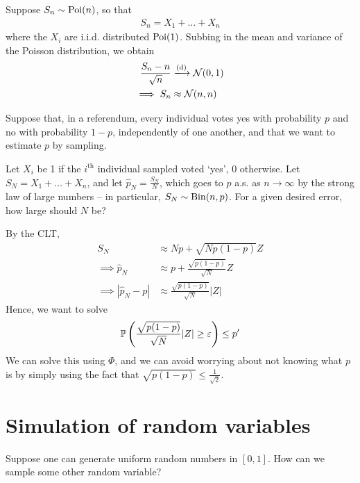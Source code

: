 \documentclass{../../template/note}
\begin{document}
    \begin{example*}
        Suppose \(S_n \sim \operatorname{Poi}(n)\), so that
        \begin{align*}
            S_n = X_1 + \dots + X_n
        \end{align*}
        where the \(X_i\) are i.i.d. distributed \(\operatorname{Poi}(1)\). Subbing in the mean and variance of the Poisson distribution, we obtain
        \begin{align*}
            \frac{S_n-n}{\sqrt n} &\dto \mc N(0, 1) \\
            \implies S_n &\approx \mc N(n, n)
        \end{align*}
    \end{example*}
    

    Suppose that, in a referendum, every individual votes yes with probability \(p\) and no with probability \(1-p\), independently of one another, and that we want to estimate \(p\) by sampling.

    Let \(X_i\) be 1 if the \(i^\text{th}\) individual sampled voted `yes', 0 otherwise. Let \(S_N = X_1 + \dots + X_n\), and let \(\hat p_N = \frac{S_N}{N}\), which goes to \(p\) a.s. as \(n \to \infty\) by the strong law of large numbers -- in particular, \(S_N \sim \operatorname{Bin}(n, p)\). For a given desired error, how large should \(N\) be?

    By the CLT,
    \begin{align*}
        S_N &\approx Np + \sqrt{Np(1-p)}Z \\
        \implies \hat p_N &\approx p + \frac{\sqrt{p(1-p)}}{\sqrt N} Z \\
        \implies |\hat p_N - p| &\approx \frac{\sqrt{p(1-p)}}{\sqrt N} |Z|
    \end{align*}
    Hence, we want to solve
    \begin{align*}
        \mathbb P\left(\frac{\sqrt{p(1-p)}}{\sqrt N} |Z| \geq \varepsilon\right) \leq p'
    \end{align*}
    We can solve this using \(\Phi\), and we can avoid worrying about not knowing what \(p\) is by simply using the fact that \(\sqrt{p(1-p)} \leq \frac 1 {\sqrt 2}\).

    \section{Simulation of random variables}

    Suppose one can generate uniform random numbers in \([0, 1]\). How can we sample some other random variable?
\end{document}
